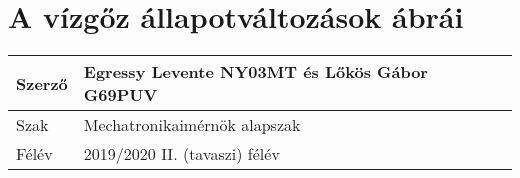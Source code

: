 \section*{A vízgőz állapotváltozások ábrái}


\begin{tabular}{ | p{2cm} | p{14cm} | } 
	\hline
	Szerző & Egressy Levente NY03MT és Lőkös Gábor G69PUV \\ 
	\hline
	Szak & Mechatronikaimérnök alapszak \\ 
	\hline
	Félév & 2019/2020 II. (tavaszi) félév \\ 
	\hline
\end{tabular}
\vspace{0.5cm}






